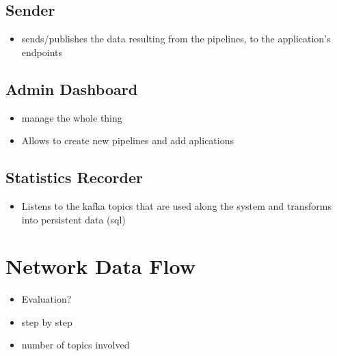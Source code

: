 \subsection{Sender}
\begin{itemize}
    \item sends/publishes the data resulting from the pipelines, to the application's endpoints
\end{itemize}

\subsection{Admin Dashboard}
\begin{itemize}
    \item manage the whole thing
    \item Allows to create new pipelines and add aplications
\end{itemize}

\subsection{Statistics Recorder}
\begin{itemize}
    \item Listens to the kafka topics that are used along the system and transforms into persistent data (sql)
\end{itemize}

\section{Network Data Flow}
\begin{itemize}
    \item Evaluation?
    \item step by step
    \item number of topics involved
\end{itemize}
